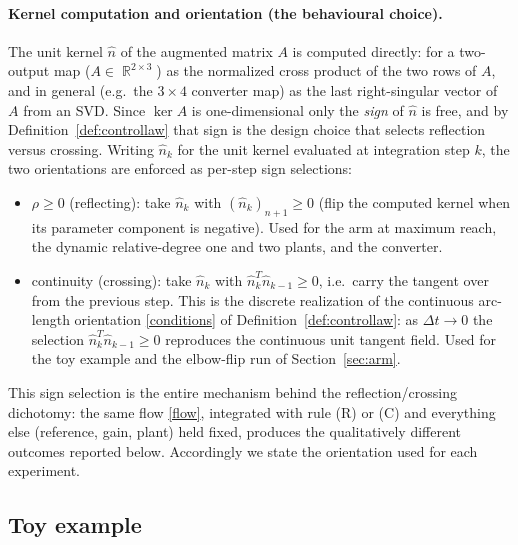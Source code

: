 \documentclass[11pt,american]{article}
\DeclareMathOperator{\R}{\mathbb{R}}
\theoremstyle{definition}
\theoremstyle{plain}
\theoremstyle{remark}
\begin{document}
\paragraph{Kernel computation and orientation (the behavioural choice).} The unit kernel $\hat n$ of the augmented matrix $A$ is computed directly: for a two-output map ($A\in\R^{2\times3}$) as the normalized cross product of the two rows of $A$, and in general (e.g.\ the $3\times4$ converter map) as the last right-singular vector of $A$ from an SVD. Since $\ker A$ is one-dimensional only the \emph{sign} of $\hat n$ is free, and by Definition~\ref{def:controllaw} that sign is the design choice that selects reflection versus crossing. Writing $\hat n_k$ for the unit kernel evaluated at integration step $k$, the two orientations are enforced as per-step sign selections:
\begin{itemize}
\item[\textbf{(R)}] $\rho\ge0$ (reflecting): take $\hat n_k$ with $(\hat n_k)_{n+1}\ge0$ (flip the computed kernel when its parameter component is negative). Used for the arm at maximum reach, the dynamic relative-degree one and two plants, and the converter.
\item[\textbf{(C)}] continuity (crossing): take $\hat n_k$ with $\hat n_k^{T}\hat n_{k-1}\ge0$, i.e.\ carry the tangent over from the previous step. This is the discrete realization of the continuous arc-length orientation \eqref{conditions} of Definition~\ref{def:controllaw}: as $\Delta t\to0$ the selection $\hat n_k^{T}\hat n_{k-1}\ge0$ reproduces the continuous unit tangent field. Used for the toy example and the elbow-flip run of Section~\ref{sec:arm}.
\end{itemize}
This sign selection is the entire mechanism behind the reflection/crossing dichotomy: the same flow \eqref{flow}, integrated with rule (R) or (C) and everything else (reference, gain, plant) held fixed, produces the qualitatively different outcomes reported below. Accordingly we state the orientation used for each experiment.

\subsection{Toy example}
\end{document}
